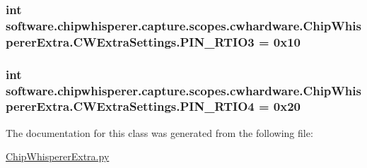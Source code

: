 \subsubsection[{P\+I\+N\+\_\+\+R\+T\+I\+O3}]{\setlength{\rightskip}{0pt plus 5cm}int software.\+chipwhisperer.\+capture.\+scopes.\+cwhardware.\+Chip\+Whisperer\+Extra.\+C\+W\+Extra\+Settings.\+P\+I\+N\+\_\+\+R\+T\+I\+O3 = 0x10\hspace{0.3cm}{\ttfamily [static]}}\label{classsoftware_1_1chipwhisperer_1_1capture_1_1scopes_1_1cwhardware_1_1ChipWhispererExtra_1_1CWExtraSettings_a34ad185f290b9a81498fa61c507fb13a}
\hypertarget{classsoftware_1_1chipwhisperer_1_1capture_1_1scopes_1_1cwhardware_1_1ChipWhispererExtra_1_1CWExtraSettings_aa997c99cf73c6c331ff16ea705c0b86f}{}
\subsubsection[{P\+I\+N\+\_\+\+R\+T\+I\+O4}]{\setlength{\rightskip}{0pt plus 5cm}int software.\+chipwhisperer.\+capture.\+scopes.\+cwhardware.\+Chip\+Whisperer\+Extra.\+C\+W\+Extra\+Settings.\+P\+I\+N\+\_\+\+R\+T\+I\+O4 = 0x20\hspace{0.3cm}{\ttfamily [static]}}\label{classsoftware_1_1chipwhisperer_1_1capture_1_1scopes_1_1cwhardware_1_1ChipWhispererExtra_1_1CWExtraSettings_aa997c99cf73c6c331ff16ea705c0b86f}


The documentation for this class was generated from the following file\+:\begin{DoxyCompactItemize}
\item 
\hyperlink{ChipWhispererExtra_8py}{Chip\+Whisperer\+Extra.\+py}\end{DoxyCompactItemize}
